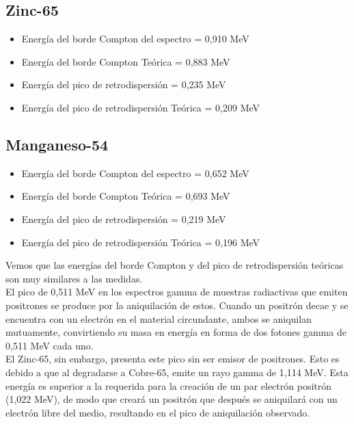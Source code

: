 \documentclass[a4paper,12pt,spanish]{article}
\begin{document}
	
	\subsection*{Zinc-65}
	\begin{itemize}
		\item Energía del borde Compton del espectro = 0,910 MeV
		\item Energía del borde Compton Teórica = 0,883 MeV
		\item Energía del pico de retrodispersión = 0,235 MeV
		\item Energía del pico de retrodispersión Teórica = 0,209 MeV
	\end{itemize}
	
	
	\subsection*{Manganeso-54}
	\begin{itemize}
		\item Energía del borde Compton del espectro = 0,652 MeV
		\item Energía del borde Compton Teórica = 0,693 MeV
		\item Energía del pico de retrodispersión = 0,219 MeV
		\item Energía del pico de retrodispersión Teórica = 0,196 MeV
	\end{itemize}
	
	
	Vemos que las energías del borde Compton y del pico de retrodispersión teóricas son muy similares a las medidas.\\
	
	
	El pico de 0,511 MeV en los espectros gamma de muestras radiactivas que emiten positrones se produce por la aniquilación de estos. 
	Cuando un positrón decae y se encuentra con un electrón en el material circundante, ambos se aniquilan mutuamente, convirtiendo su masa en energía en forma de dos fotones gamma de 0,511 MeV cada uno.\\
	
	
	
	El Zinc-65, sin embargo, presenta este pico sin ser emisor de positrones. Esto es debido a que al degradarse a Cobre-65, emite un rayo gamma de 1,114 MeV. Esta energía es superior a la requerida para la creación de un par electrón positrón (1,022 MeV), de modo que creará un positrón que después se aniquilará con un electrón libre del medio, resultando en el pico de aniquilación observado.\\
	
\end{document}
